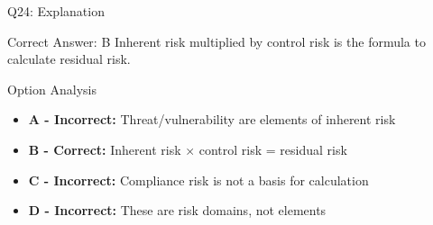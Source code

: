 \documentclass{beamer}
\begin{document}
	\begin{frame}{Q24: Explanation}
		\begin{block}{Correct Answer: B}
			Inherent risk multiplied by control risk is the formula to calculate residual risk.
		\end{block}
		\begin{block}{Option Analysis}
			\begin{itemize}
				\item \textbf{A - Incorrect:} Threat/vulnerability are elements of inherent risk
				\item \textbf{B - Correct:} Inherent risk × control risk = residual risk
				\item \textbf{C - Incorrect:} Compliance risk is not a basis for calculation
				\item \textbf{D - Incorrect:} These are risk domains, not elements
			\end{itemize}
		\end{block}
	\end{frame}
	
\end{document}
